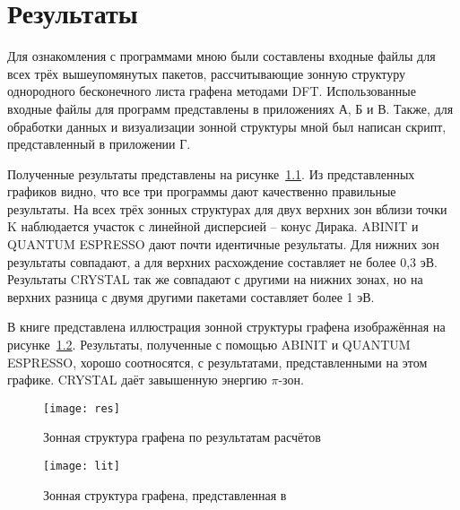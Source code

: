 \chapter{Результаты}
 
 Для ознакомления с программами мною были составлены входные файлы для всех трёх вышеупомянутых пакетов, рассчитывающие зонную структуру однородного бесконечного листа графена методами DFT. Использованные входные файлы для программ представлены в приложениях А, Б и В. Также, для обработки данных и визуализации зонной структуры мной был написан скрипт, представленный в приложении Г.

 Полученные результаты представлены на рисунке~\ref{res}.
 Из представленных графиков видно, что все три программы дают качественно правильные результаты. На всех трёх зонных структурах для двух верхних зон вблизи точки K наблюдается участок с линейной дисперсией -- конус Дирака. ABINIT и QUANTUM ESPRESSO дают почти идентичные результаты. Для нижних зон результаты совпадают, а для верхних расхождение составляет не более 0,3 эВ. Результаты CRYSTAL так же совпадают с другими на нижних зонах, но на верхних разница с двумя другими пакетами составляет более 1 эВ.

 В книге \cite{graphene} представлена иллюстрация зонной структуры графена изображённая на рисунке~\ref{lit}. Результаты, полученные с помощью ABINIT и QUANTUM ESPRESSO, хорошо соотносятся, с результатами, представленными на этом графике. CRYSTAL даёт завышенную энергию \( \pi \)-зон.

 \begin{figure}[h!]
    \center
    \texttt{[image: res]}
    \caption{Зонная структура графена по результатам расчётов}
    \label{res}
\end{figure}
\vspace*{4cm}
\begin{figure}[h!]
    \center
    \texttt{[image: lit]}
    \caption{Зонная структура графена, представленная в \cite{graphene}}
    \label{lit}
\end{figure}
\clearpage
